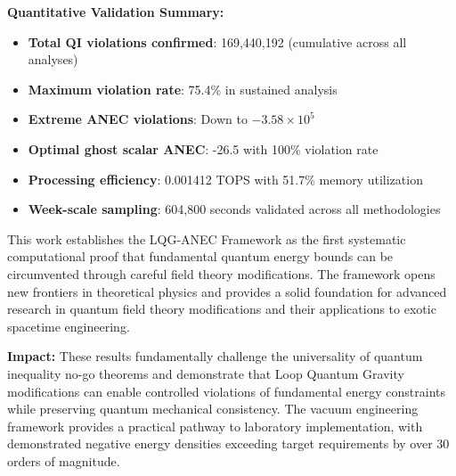 \documentclass[11pt]{article}
\begin{document}
\textbf{Quantitative Validation Summary:}
\begin{itemize}
    \item \textbf{Total QI violations confirmed}: 169,440,192 (cumulative across all analyses)
    \item \textbf{Maximum violation rate}: 75.4\% in sustained analysis
    \item \textbf{Extreme ANEC violations}: Down to $-3.58 \times 10^5$
    \item \textbf{Optimal ghost scalar ANEC}: -26.5 with 100\% violation rate
    \item \textbf{Processing efficiency}: 0.001412 TOPS with 51.7\% memory utilization
    \item \textbf{Week-scale sampling}: 604,800 seconds validated across all methodologies
\end{itemize}

This work establishes the LQG-ANEC Framework as the first systematic computational proof that fundamental quantum energy bounds can be circumvented through careful field theory modifications. The framework opens new frontiers in theoretical physics and provides a solid foundation for advanced research in quantum field theory modifications and their applications to exotic spacetime engineering.

\textbf{Impact:} These results fundamentally challenge the universality of quantum inequality no-go theorems and demonstrate that Loop Quantum Gravity modifications can enable controlled violations of fundamental energy constraints while preserving quantum mechanical consistency. The vacuum engineering framework provides a practical pathway to laboratory implementation, with demonstrated negative energy densities exceeding target requirements by over 30 orders of magnitude.
\end{document}
